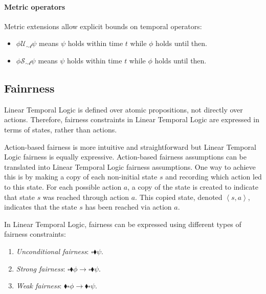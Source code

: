 \paragraph*{Metric operators}
Metric extensions allow explicit bounds on temporal operators:
\begin{itemize}
    \item $\phi\mathcal{U_{\sim t}}\psi$ means $\psi$ holds within time $t$ while $\phi$ holds until then.
    \item $\phi\mathcal{S_{\sim t}}\psi$ means $\psi$ holds within time $t$ while $\phi$ holds until then.
\end{itemize}

\subsection{Fainrness}
Linear Temporal Logic is defined over atomic propositions, not directly over actions.
Therefore, fairness constraints in Linear Temporal Logic are expressed in terms of states, rather than actions.

Action-based fairness is more intuitive and straightforward but Linear Temporal Logic fairness is equally expressive.
Action-based fairness assumptions can be translated into Linear Temporal Logic fairness assumptions.
One way to achieve this is by making a copy of each non-initial state $s$ and recording which action led to this state. 
For each possible action $a$, a copy of the state is created to indicate that state $s$ was reached through action $a$. 
This copied state, denoted $\left\langle s,a\right\rangle$, indicates that the state $s$ has been reached via action $a$.

In Linear Temporal Logic, fairness can be expressed using different types of fairness constraints:
\begin{enumerate}
    \item \textit{Unconditional fairness}: $\square\blacklozenge\psi$. 
    \item \textit{Strong fairness}: $\square\blacklozenge\phi\rightarrow\square\blacklozenge\psi$.
    \item \textit{Weak fairness}: $\blacklozenge\square\phi\rightarrow\blacklozenge\square\psi$.
\end{enumerate}

